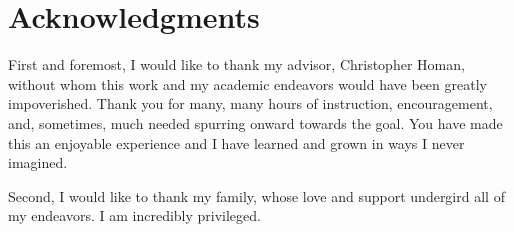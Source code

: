 
\chapter*{Acknowledgments}

First and foremost, I would like to thank my advisor, Christopher Homan, without whom this work and my academic endeavors would have been greatly impoverished. Thank you for many, many hours of instruction, encouragement, and, sometimes, much needed spurring onward towards the goal. You have made this an enjoyable experience and I have learned and grown in ways I never imagined.

Second, I would like to thank my family, whose love and support undergird all of my endeavors. I am incredibly privileged.
